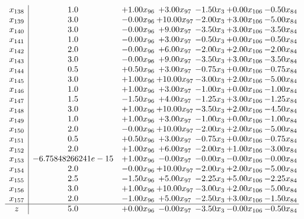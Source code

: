 \documentclass[8pt]{article}
\begin{document}
\[\begin{array}{c| c c@{\hskip 2pt} c@{\hskip 2pt} c@{\hskip 2pt} c@{\hskip 2pt} c@{\hskip 2pt} }
 x_{138}   &  1.0 & +  1.00 x_{96} & +  3.00 x_{97} & -1.50 x_{3} & +  0.00 x_{106} & -0.50 x_{84}\\
 x_{139}   &  3.0 & -0.00 x_{96} & + 10.00 x_{97} & -2.00 x_{3} & +  3.00 x_{106} & -5.00 x_{84}\\
 x_{140}   &  3.0 & -0.00 x_{96} & +  9.00 x_{97} & -3.50 x_{3} & +  3.00 x_{106} & -3.50 x_{84}\\
 x_{141}   &  1.0 & -0.00 x_{96} & +  3.00 x_{97} & -0.50 x_{3} & +  0.00 x_{106} & -0.50 x_{84}\\
 x_{142}   &  2.0 & -0.00 x_{96} & +  6.00 x_{97} & -2.00 x_{3} & +  2.00 x_{106} & -2.00 x_{84}\\
 x_{143}   &  3.0 & -0.00 x_{96} & +  9.00 x_{97} & -3.50 x_{3} & +  3.00 x_{106} & -3.50 x_{84}\\
 x_{144}   &  0.5 & +  0.50 x_{96} & +  3.00 x_{97} & -0.75 x_{3} & +  0.00 x_{106} & -0.75 x_{84}\\
 x_{145}   &  3.0 & +  1.00 x_{96} & + 10.00 x_{97} & -3.00 x_{3} & +  2.00 x_{106} & -5.00 x_{84}\\
 x_{146}   &  1.0 & +  1.00 x_{96} & +  3.00 x_{97} & -1.00 x_{3} & +  0.00 x_{106} & -1.00 x_{84}\\
 x_{147}   &  1.5 & -1.50 x_{96} & +  4.00 x_{97} & -1.25 x_{3} & +  3.00 x_{106} & -1.25 x_{84}\\
 x_{148}   &  3.0 & +  1.00 x_{96} & + 10.00 x_{97} & -3.50 x_{3} & +  2.00 x_{106} & -4.50 x_{84}\\
 x_{149}   &  1.0 & +  1.00 x_{96} & +  3.00 x_{97} & -1.00 x_{3} & +  0.00 x_{106} & -1.00 x_{84}\\
 x_{150}   &  2.0 & -0.00 x_{96} & + 10.00 x_{97} & -2.00 x_{3} & +  2.00 x_{106} & -5.00 x_{84}\\
 x_{151}   &  0.5 & +  0.50 x_{96} & +  3.00 x_{97} & -0.75 x_{3} & +  0.00 x_{106} & -0.75 x_{84}\\
 x_{152}   &  2.0 & +  1.00 x_{96} & +  6.00 x_{97} & -2.00 x_{3} & +  1.00 x_{106} & -3.00 x_{84}\\
 x_{153}   &  -6.75848266241e-15 & +  1.00 x_{96} & -0.00 x_{97} & -0.00 x_{3} & -0.00 x_{106} & -0.00 x_{84}\\
 x_{154}   &  2.0 & -0.00 x_{96} & + 10.00 x_{97} & -2.00 x_{3} & +  2.00 x_{106} & -5.00 x_{84}\\
 x_{155}   &  2.5 & -1.50 x_{96} & +  5.00 x_{97} & -2.25 x_{3} & +  5.00 x_{106} & -2.25 x_{84}\\
 x_{156}   &  3.0 & +  1.00 x_{96} & + 10.00 x_{97} & -3.00 x_{3} & +  2.00 x_{106} & -5.00 x_{84}\\
 x_{157}   &  2.0 & -1.00 x_{96} & +  5.00 x_{97} & -2.50 x_{3} & +  3.00 x_{106} & -1.50 x_{84}\\
\hline
z    &  5.0 & +  0.00 x_{96} & -0.00 x_{97} & -3.50 x_{3} & -0.00 x_{106} & -0.50 x_{84}\\
\end{array}\]
\end{document}
